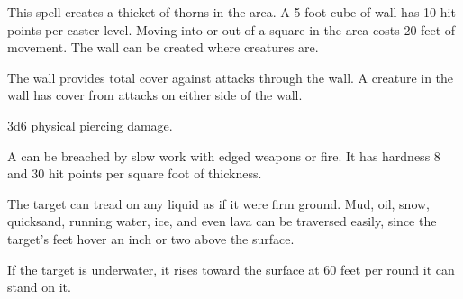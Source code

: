 \begin{spellheader}
\end{spellheader}
\begin{spellcontent}
    \begin{spelltargetinginfo}
    \end{spelltargetinginfo}
    \begin{spelleffects}
        \spelleffect This spell creates a thicket of thorns in the area. A 5-foot cube of wall has 10 hit points per caster level. Moving into or out of a square in the area costs 20 feet of movement. The wall can be created where creatures are.

        The wall provides total cover against attacks through the wall. A creature in the wall has cover from attacks on either side of the wall.
        \spelldur{\durlong \dismissable}
    \end{spelleffects}
\end{spellcontent}
\begin{spellsubcontent}
    \begin{spelltargetinginfo}
    \end{spelltargetinginfo}
    \begin{spelleffects}
        \spelleffect 3d6 physical piercing damage.
    \end{spelleffects}
\end{spellsubcontent}
\begin{spellfooter}
    \spellnotes A  can be breached by slow work with edged weapons or fire. It has hardness 8 and 30 hit points per square foot of thickness.
\end{spellfooter}

\begin{spellheader}
    \begin{spelltargetinginfo}
    \end{spelltargetinginfo}
    \begin{spelleffects}
    \end{spelleffects}
\end{spellheader}
\begin{spellcontent}
    \spelleffect The target can tread on any liquid as if it were firm ground. Mud, oil, snow, quicksand, running water, ice, and even lava can be traversed easily, since the target's feet hover an inch or two above the surface.
    \par If the target is underwater, it rises toward the surface at 60 feet per round it can stand on it.
    \spelldur{\durlong \dismissable}
\end{spellcontent}
\begin{spellfooter}

\end{spellfooter}

